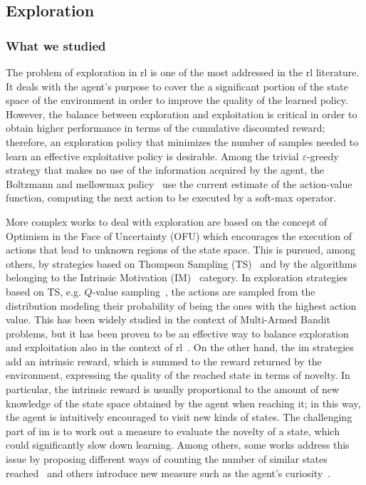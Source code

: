 \subsection{Exploration}
\subsubsection{What we studied}
The problem of exploration in \gls{rl} is one of the most addressed in the \gls{rl} literature. It deals with the agent's purpose to cover the a significant portion of the state space of the environment in order to improve the quality of the learned policy. However, the balance between exploration and exploitation is critical in order to obtain higher performance in terms of the cumulative discounted reward; therefore, an exploration policy that minimizes the number of samples needed to learn an effective exploitative policy is desirable. Among the trivial $\varepsilon$-greedy strategy that makes no use of the information acquired by the agent, the Boltzmann and mellowmax policy~\cite{asadi2016alternative} use the current estimate of the action-value function, computing the next action to be executed by a soft-max operator.

More complex works to deal with exploration are based on the concept of Optimism in the Face of Uncertainty (OFU) which encourages the execution of actions that lead to unknown regions of the state space. This is pursued, among others, by strategies based on Thompson Sampling (TS)~\cite{thompson1933likelihood} and by the algorithms belonging to the Intrinsic Motivation (IM)~\cite{schmidhuber1991possibility} category. In exploration strategies based on TS, e.g. $Q$-value sampling~\cite{dearden1998bayesian}, the actions are sampled from the distribution modeling their probability of being the ones with the highest action value. This has been widely studied in the context of Multi-Armed Bandit problems, but it has been proven to be an effective way to balance exploration and exploitation also in the context of \gls{rl}~\cite{auer2007logarithmic}. On the other hand, the \gls{im} strategies add an intrinsic reward, which is summed to the reward returned by the environment, expressing the quality of the reached state in terms of novelty. In particular, the intrinsic reward is usually proportional to the amount of new knowledge of the state space obtained by the agent when reaching it; in this way, the agent is intuitively encouraged to visit new kinds of states. The challenging part of \gls{im} is to work out a measure to evaluate the novelty of a state, which could significantly slow down learning. Among others, some works address this issue by proposing different ways of counting the number of similar states reached~\cite{tang2017exploration} and others introduce new measure such as the agent's curiosity~\cite{schmidhuber1991possibility, pathak2017curiosity}.

